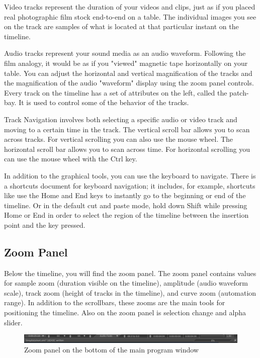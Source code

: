 Video tracks represent the duration of your videos and clips, just as if you placed real photographic film stock end-to-end on a table. 
The individual images you see on the track are samples of what is located at that particular instant on the timeline.

Audio tracks represent your sound media as an audio waveform. 
Following the film analogy, it would be as if you "viewed" magnetic tape horizontally on your table. 
You can adjust the horizontal and vertical magnification of the tracks and the magnification of the audio "waveform" display using the zoom panel controls. 
Every track on the timeline has a set of attributes on the left, called the patch- bay. 
It is used to control some of the behavior of the tracks.

Track Navigation involves both selecting a specific audio or video track and moving to a certain time in the track. 
The vertical scroll bar allows you to scan across tracks. 
For vertical scrolling you can also use the mouse wheel. 
The horizontal scroll bar allows you to scan across time. For horizontal scrolling you can use the mouse wheel with the Ctrl key.  

In addition to the graphical tools, you can use the keyboard to navigate.  
There is a shortcuts document for keyboard navigation; it includes, for example, shortcuts like use the Home and End keys to instantly go to the beginning or end of the timeline.  
Or in the default cut and paste mode, hold down Shift while pressing Home or End in order to select the region of the timeline between the insertion point and the key pressed.

\subsection{Zoom Panel}%
\label{sub:zoom_panel}

Below the timeline, you will find the zoom panel. 
The zoom panel contains values for sample zoom (duration visible on the timeline), amplitude (audio waveform scale), track zoom (height of tracks in the timeline), and curve zoom (automation range). 
In addition to the scrollbars, these zooms are the main tools for positioning the timeline.  
Also on the zoom panel is selection change and alpha slider.

\begin{figure}[htpb]
    \centering
    \includegraphics[width=0.99\linewidth]{images/zoompanel.png}
    \caption{Zoom panel on the bottom of the main program window}
    \label{fig:zoompanel}
\end{figure}

